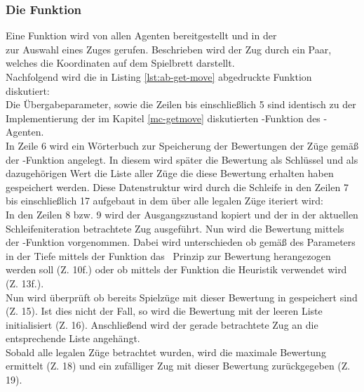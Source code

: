 \subsubsection{Die Funktion }
Eine Funktion  wird von allen Agenten bereitgestellt und in der \\ zur Auswahl eines Zuges gerufen. Beschrieben wird der Zug durch ein Paar, welches die Koordinaten auf dem Spielbrett darstellt.
\\Nachfolgend wird die in Listing \ref{lst:ab-get-move} abgedruckte Funktion diskutiert:
\\Die Übergabeparameter, sowie die Zeilen bis einschließlich 5  sind identisch zu der Implementierung der im Kapitel \ref{mc-getmove} diskutierten -Funktion des \mxZitat{\mc}-Agenten.
\\In Zeile 6 wird ein Wörterbuch zur Speicherung der Bewertungen der Züge gemäß der -Funktion angelegt. In diesem wird später die Bewertung als Schlüssel und als dazugehörigen Wert die Liste aller Züge die diese Bewertung erhalten haben gespeichert werden. Diese Datenstruktur wird durch die Schleife in den Zeilen 7 bis einschließlich 17 aufgebaut in dem über alle legalen Züge iteriert wird:
\\In den Zeilen 8 bzw. 9 wird der Ausgangszustand kopiert und der in der aktuellen Schleifeniteration betrachtete Zug  ausgeführt. Nun wird die Bewertung mittels der -Funktion vorgenommen. Dabei wird unterschieden ob gemäß des Parameters  in der Tiefe  mittels der Funktion  das \mc\ Prinzip zur Bewertung herangezogen werden soll (Z. 10f.) oder ob mittels der Funktion  die Heuristik verwendet wird (Z. 13f.).
\\Nun wird überprüft ob bereits Spielzüge mit dieser Bewertung in  gespeichert sind (Z. 15). Ist dies nicht der Fall, so wird die Bewertung mit der leeren Liste initialisiert (Z. 16). Anschließend wird der gerade betrachtete Zug  an die entsprechende Liste angehängt.
\\Sobald alle legalen Züge betrachtet wurden, wird die maximale Bewertung ermittelt (Z. 18) und ein zufälliger Zug mit dieser Bewertung zurückgegeben (Z. 19).
\newpage
